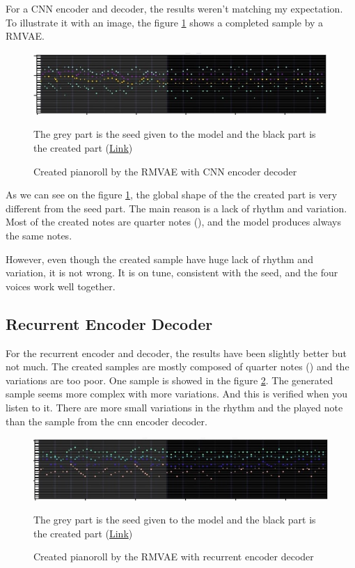 \documentclass[12pt]{report}
\begin{document}
For a CNN encoder and decoder, the results weren't matching my expectation.
To illustrate it with an image, the figure \ref{fig:rmvae-generated} shows a completed sample by a RMVAE.

\begin{figure}[htpb]
    \centering
    \includegraphics[width=\textwidth]{images/generated_midis/RMVAE/generated_cnn.jpg}
    \caption{Created pianoroll by the RMVAE with CNN encoder decoder}
    The grey part is the seed given to the model and the black part is the created part   (\href{https://github.com/ValentinVignal/midiGenerator/blob/master/samples/results/generated_pianoroll.mid}{Link})
    \label{fig:rmvae-generated}
\end{figure}

As we can see on the figure \ref{fig:rmvae-generated}, the global shape of the the created part is very different from the seed part.
The main reason is a lack of rhythm and variation.
Most of the created notes are quarter notes (\musQuarter), and the model produces always the same notes.

However, even though the created sample have huge lack of rhythm and variation, it is not wrong.
It is on tune, consistent with the seed, and the four voices work well together.

\subsection{Recurrent Encoder Decoder}

For the recurrent encoder and decoder, the results have been slightly better but not much.
The created samples are mostly composed of quarter notes (\musQuarter) and the variations are too poor.
One sample is showed in the figure \ref{fig:rrmvae-generated}.
The generated sample seems more complex with more variations.
And this is verified when you listen to it.
There are more small variations in the rhythm and the played note than the sample from the cnn encoder decoder.

\begin{figure}[htpb]
    \centering
    \includegraphics[width=\textwidth]{images/generated_midis/RRMVAE/generated-rnn.jpg}
    \caption{Created pianoroll by the RMVAE with recurrent encoder decoder}
    The grey part is the seed given to the model and the black part is the created part   (\href{https://github.com/ValentinVignal/midiGenerator/blob/master/samples/results/generated-pianoroll-rnn.mid}{Link})
    \label{fig:rrmvae-generated}
\end{figure}
\end{document}
